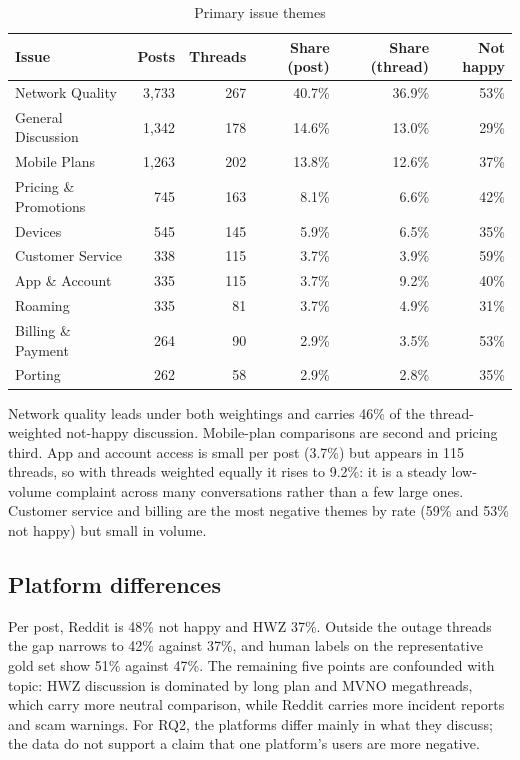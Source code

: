 \documentclass[11pt,a4paper]{article}
\begin{document}
\begin{table}[H]
\centering
\caption{Primary issue themes}
\label{tab:overallfindings}
\begin{tabular}{lrrrrr}
\toprule
\textbf{Issue} & \textbf{Posts} & \textbf{Threads} & \textbf{Share (post)} & \textbf{Share (thread)} & \textbf{Not happy} \\
\midrule
Network Quality & 3,733 & 267 & 40.7\% & 36.9\% & 53\% \\
General Discussion & 1,342 & 178 & 14.6\% & 13.0\% & 29\% \\
Mobile Plans & 1,263 & 202 & 13.8\% & 12.6\% & 37\% \\
Pricing \& Promotions & 745 & 163 & 8.1\% & 6.6\% & 42\% \\
Devices & 545 & 145 & 5.9\% & 6.5\% & 35\% \\
Customer Service & 338 & 115 & 3.7\% & 3.9\% & 59\% \\
App \& Account & 335 & 115 & 3.7\% & 9.2\% & 40\% \\
Roaming & 335 & 81 & 3.7\% & 4.9\% & 31\% \\
Billing \& Payment & 264 & 90 & 2.9\% & 3.5\% & 53\% \\
Porting & 262 & 58 & 2.9\% & 2.8\% & 35\% \\
\bottomrule
\end{tabular}
\end{table}

Network quality leads under both weightings and carries 46\% of the thread-weighted not-happy discussion. Mobile-plan comparisons are second and pricing third. App and account access is small per post (3.7\%) but appears in 115 threads, so with threads weighted equally it rises to 9.2\%: it is a steady low-volume complaint across many conversations rather than a few large ones. Customer service and billing are the most negative themes by rate (59\% and 53\% not happy) but small in volume.

\subsection{Platform differences}

Per post, Reddit is 48\% not happy and HWZ 37\%. Outside the outage threads the gap narrows to 42\% against 37\%, and human labels on the representative gold set show 51\% against 47\%. The remaining five points are confounded with topic: HWZ discussion is dominated by long plan and MVNO megathreads, which carry more neutral comparison, while Reddit carries more incident reports and scam warnings. For RQ2, the platforms differ mainly in what they discuss; the data do not support a claim that one platform's users are more negative.
\end{document}
